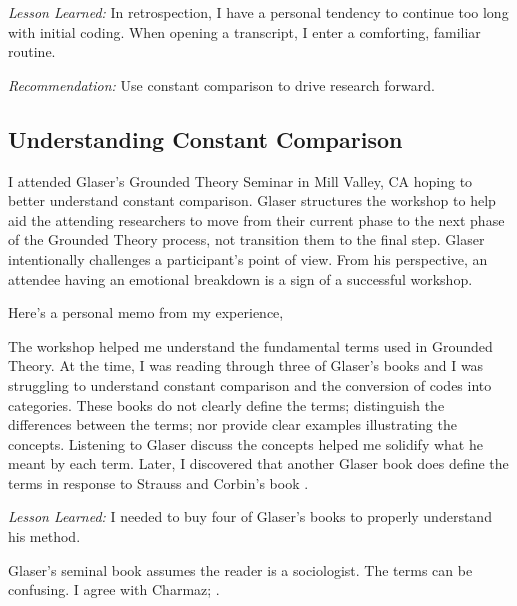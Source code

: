 \textit{Lesson Learned:} In retrospection, I have a personal tendency to continue too long with initial coding. When opening a transcript, I enter a comforting, familiar routine. 

\textit{Recommendation:} Use constant comparison to drive research forward.

\subsection{Understanding Constant Comparison}
I attended Glaser's Grounded Theory Seminar in Mill Valley, CA hoping to better understand constant comparison. Glaser structures the workshop to help aid the attending researchers to move from their current phase to the next phase of the Grounded Theory process, not transition them to the final step. Glaser intentionally challenges a participant's point of view. From his perspective, an attendee having an emotional breakdown is a sign of a successful workshop.

Here's a personal memo from my experience, 

The workshop helped me understand the fundamental terms used in Grounded Theory. At the time, I was reading through three of Glaser's books \cite{GlaserDiscovery, GlaserIssues, GlaserTheoreticalSensitivity} and I was struggling to understand constant comparison and the conversion of codes into categories. These books do not clearly define the terms; distinguish the differences between the terms; nor provide clear examples illustrating the concepts. Listening to Glaser discuss the concepts helped me solidify what he meant by each term. Later, I discovered that another Glaser book \cite{GlaserBasics} does define the terms in response to Strauss and Corbin's book \cite{Strauss1988Basics}.

\textit{Lesson Learned:} I needed to buy four of Glaser's books to properly understand his method.

Glaser's seminal book assumes the reader is a sociologist. The terms can be confusing. I agree with Charmaz;  \cite{GlaserConstructivistGroundedTheory}.

